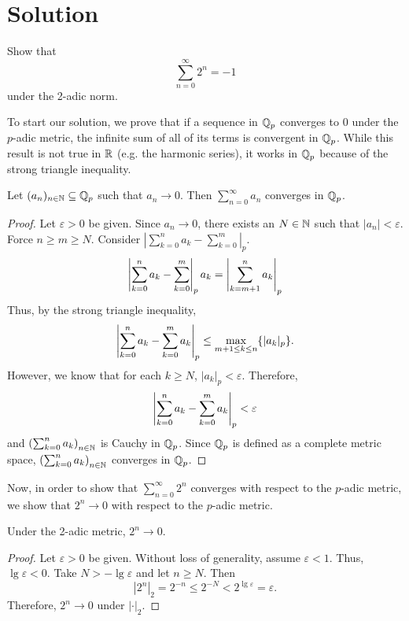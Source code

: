 \documentclass[notitlepage]{problem-solving}
\begin{document}
\section{Solution}

\begin{problem*}
	Show that
	\[
		\sum_{n=0}^\infty 2^n = -1
	\]
	under the 2-adic norm.
\end{problem*}

To start our solution, we prove that if a sequence in $\mathbb{Q}_p$ converges to 0 under the $p$-adic metric, the infinite sum of all of its terms is convergent in $\mathbb{Q}_p$.
While this result is not true in $\mathbb{R}$ (e.g. the harmonic series), it works in $\mathbb{Q}_p$ because of the strong triangle inequality.

\begin{thm}
	Let $(a_n)_{n\in\mathbb{N}}\subseteq\mathbb{Q}_p$ such that $a_n\rightarrow 0$.
	Then $\sum_{n=0}^\infty a_n$ converges in $\mathbb{Q}_p$.
\end{thm}
\begin{proof}
	Let $\varepsilon > 0$ be given.
	Since $a_n\rightarrow 0$, there exists an $N\in\mathbb{N}$ such that $|a_n|<\varepsilon$.
	Force $n\geq m\geq N$.
	Consider $|\sum_{k=0}^n a_k - \sum_{k=0}^m|_p$.
	\[
		\left| \sum_{k=0}^n a_k - \sum_{k=0}^m \right|_p a_k = \left| \sum_{k=m+1}^n a_k \right|_p
	\]
	Thus, by the strong triangle inequality,
	\[
		\left| \sum_{k=0}^n a_k - \sum_{k=0}^m a_k \right|_p \leq \max\limits_{m+1\leq k\leq n}\lbrace |a_k|_p \rbrace.
	\]
	However, we know that for each $k\geq N$, $|a_k|_p<\varepsilon$.
	Therefore,
	\[
		\left| \sum_{k=0}^n a_k - \sum_{k=0}^m a_k \right|_p < \varepsilon
	\]
	and $\left( \sum_{k=0}^n a_k \right)_{n\in\mathbb{N}}$ is Cauchy in $\mathbb{Q}_p$.
	Since $\mathbb{Q}_p$ is defined as a complete metric space, $\left( \sum_{k=0}^n a_k \right)_{n\in\mathbb{N}}$ converges in $\mathbb{Q}_p$.
\end{proof}

Now, in order to show that $\sum_{n=0}^\infty 2^n$ converges with respect to the $p$-adic metric, we show that $2^n\rightarrow 0$ with respect to the $p$-adic metric.

\begin{lemma}
	Under the 2-adic metric, $2^n\rightarrow 0$.
\end{lemma}
\begin{proof}
	Let $\varepsilon > 0$ be given.
	Without loss of generality, assume $\varepsilon < 1$.
	Thus, $\lg\varepsilon < 0$.
	Take $N > -\lg\varepsilon$ and let $n\geq N$.
	Then
	\[
		|2^n|_2 = 2^{-n} \leq 2^{-N} < 2^{\lg\varepsilon} = \varepsilon.
	\]
	Therefore, $2^n\rightarrow 0$ under $|\cdot|_2$.
\end{proof}
\end{document}
